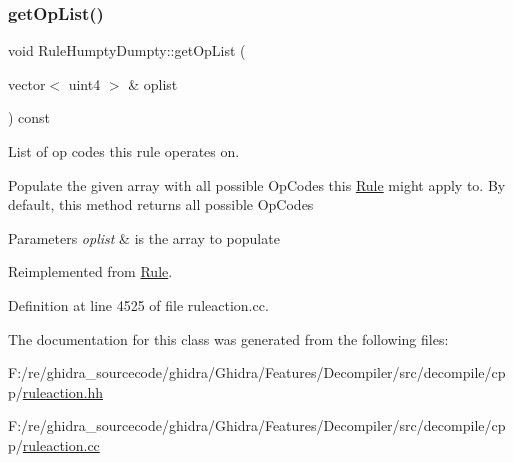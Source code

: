 \subsubsection{\texorpdfstring{getOpList()}{getOpList()}}
{\footnotesize\ttfamily void Rule\+Humpty\+Dumpty\+::get\+Op\+List (\begin{DoxyParamCaption}\item[{vector$<$ uint4 $>$ \&}]{oplist }\end{DoxyParamCaption}) const\hspace{0.3cm}{\ttfamily [virtual]}}



List of op codes this rule operates on. 

Populate the given array with all possible Op\+Codes this \mbox{\hyperlink{class_rule}{Rule}} might apply to. By default, this method returns all possible Op\+Codes 
\begin{DoxyParams}{Parameters}
{\em oplist} & is the array to populate \\
\hline
\end{DoxyParams}


Reimplemented from \mbox{\hyperlink{class_rule_a4023bfc7825de0ab866790551856d10e}{Rule}}.



Definition at line 4525 of file ruleaction.\+cc.



The documentation for this class was generated from the following files\+:\begin{DoxyCompactItemize}
\item 
F\+:/re/ghidra\+\_\+sourcecode/ghidra/\+Ghidra/\+Features/\+Decompiler/src/decompile/cpp/\mbox{\hyperlink{ruleaction_8hh}{ruleaction.\+hh}}\item 
F\+:/re/ghidra\+\_\+sourcecode/ghidra/\+Ghidra/\+Features/\+Decompiler/src/decompile/cpp/\mbox{\hyperlink{ruleaction_8cc}{ruleaction.\+cc}}\end{DoxyCompactItemize}
